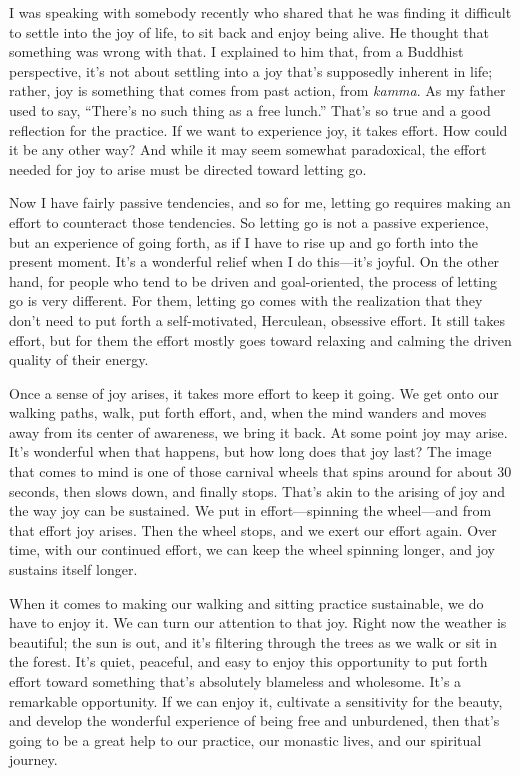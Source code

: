 
I was speaking with somebody recently who shared that he was finding it 
difficult to settle into the joy of life, to sit back and enjoy being 
alive. He thought that something was wrong with that. I explained to 
him that, from a Buddhist perspective, it's not about settling into a 
joy that's supposedly inherent in life; rather, joy is something that 
comes from past action, from \emph{kamma}. As my father used to say, 
``There's no such thing as a free lunch.'' That's so true and a good 
reflection for the practice. If we want to experience joy, it takes 
effort. How could it be any other way? And while it may seem somewhat 
paradoxical, the effort needed for joy to arise must be directed toward 
letting go.

Now I have fairly passive tendencies, and so for me, letting go 
requires making an effort to counteract those tendencies. So letting go 
is not a passive experience, but an experience of going forth, as if I 
have to rise up and go forth into the present moment. It's a wonderful 
relief when I do this---it's joyful. On the other hand, for people who 
tend to be driven and goal-oriented, the process of letting go is very 
different. For them, letting go comes with the realization that they 
don't need to put forth a self-motivated, Herculean, obsessive effort. 
It still takes effort, but for them the effort mostly goes toward 
relaxing and calming the driven quality of their energy.

Once a sense of joy arises, it takes more effort to keep it going. We 
get onto our walking paths, walk, put forth effort, and, when the mind 
wanders and moves away from its center of awareness, we bring it back. 
At some point joy may arise. It's wonderful when that happens, but how 
long does that joy last? The image that comes to mind is one of those 
carnival wheels that spins around for about 30 seconds, then slows 
down, and finally stops. That's akin to the arising of joy and the way 
joy can be sustained. We put in effort---spinning the wheel---and from 
that effort joy arises. Then the wheel stops, and we exert our effort 
again. Over time, with our continued effort, we can keep the wheel 
spinning longer, and joy sustains itself longer.

When it comes to making our walking and sitting practice sustainable, 
we do have to enjoy it. We can turn our attention to that joy. Right 
now the weather is beautiful; the sun is out, and it's filtering 
through the trees as we walk or sit in the forest. It's quiet, 
peaceful, and easy to enjoy this opportunity to put forth effort toward 
something that's absolutely blameless and wholesome. It's a remarkable 
opportunity. If we can enjoy it, cultivate a sensitivity for the 
beauty, and develop the wonderful experience of being free and 
unburdened, then that's going to be a great help to our practice, our 
monastic lives, and our spiritual journey.

